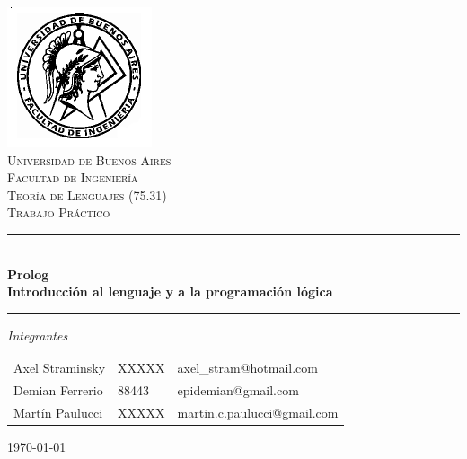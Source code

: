 \documentclass[12pt,titlepage]{report}
\begin{document}
\begin{titlepage}

\thispagestyle{empty}

\begin{center}
\includegraphics[scale=0.55]{./fiuba}\\
\textsc{\Large Universidad de Buenos Aires}\\[0.2cm]
\textsc{\Large Facultad de Ingeniería}\\[1.5cm]


\textsc{\large Teoría de Lenguajes (75.31)} \\[0.3cm]
\textsc{\large Trabajo Práctico} \\[0.5cm]

\rule{\linewidth}{0.5mm} \\[0.4cm]
{\huge \bfseries Prolog} \\[0.3cm]
{\Large \bfseries Introducción al lenguaje y a la programación lógica}
\rule{\linewidth}{0.5mm} 

\vfill

\begin{flushleft}
\Large\emph{Integrantes} \\[0.2cm]


\begin{tabular}{lll}
Axel Straminsky & XXXXX & axel\_stram@hotmail.com \\
Demian Ferrerio & 88443 & epidemian@gmail.com \\
Martín Paulucci & XXXXX & martin.c.paulucci@gmail.com \\
\end{tabular}
\end{flushleft}

{\Large \today}

\end{center}
\end{titlepage}

\end{document}
